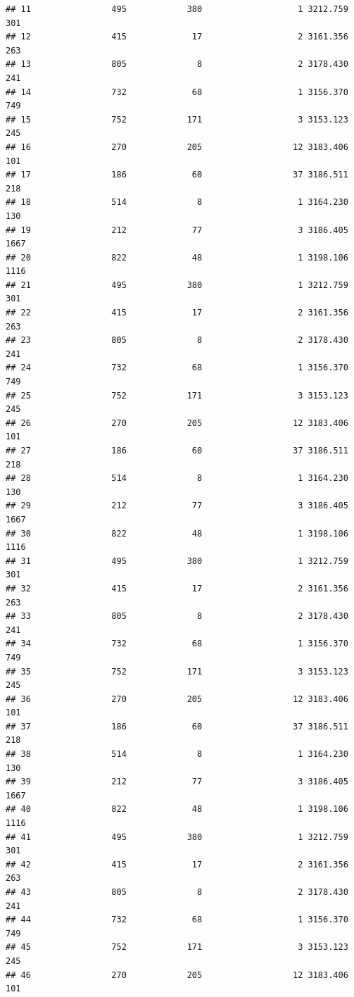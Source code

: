 \documentclass[
]{article}
\begin{document}
\begin{verbatim}
## 11                495            380                   1 3212.759  301
## 12                415             17                   2 3161.356  263
## 13                805              8                   2 3178.430  241
## 14                732             68                   1 3156.370  749
## 15                752            171                   3 3153.123  245
## 16                270            205                  12 3183.406  101
## 17                186             60                  37 3186.511  218
## 18                514              8                   1 3164.230  130
## 19                212             77                   3 3186.405 1667
## 20                822             48                   1 3198.106 1116
## 21                495            380                   1 3212.759  301
## 22                415             17                   2 3161.356  263
## 23                805              8                   2 3178.430  241
## 24                732             68                   1 3156.370  749
## 25                752            171                   3 3153.123  245
## 26                270            205                  12 3183.406  101
## 27                186             60                  37 3186.511  218
## 28                514              8                   1 3164.230  130
## 29                212             77                   3 3186.405 1667
## 30                822             48                   1 3198.106 1116
## 31                495            380                   1 3212.759  301
## 32                415             17                   2 3161.356  263
## 33                805              8                   2 3178.430  241
## 34                732             68                   1 3156.370  749
## 35                752            171                   3 3153.123  245
## 36                270            205                  12 3183.406  101
## 37                186             60                  37 3186.511  218
## 38                514              8                   1 3164.230  130
## 39                212             77                   3 3186.405 1667
## 40                822             48                   1 3198.106 1116
## 41                495            380                   1 3212.759  301
## 42                415             17                   2 3161.356  263
## 43                805              8                   2 3178.430  241
## 44                732             68                   1 3156.370  749
## 45                752            171                   3 3153.123  245
## 46                270            205                  12 3183.406  101

\end{verbatim}
\end{document}
